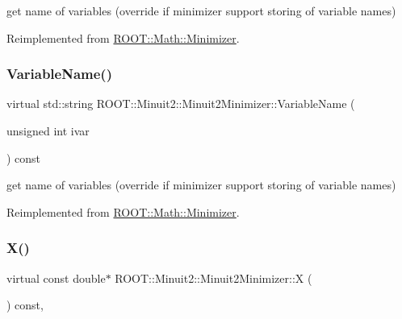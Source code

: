 get name of variables (override if minimizer support storing of variable names) 



Reimplemented from \mbox{\hyperlink{classROOT_1_1Math_1_1Minimizer_a4d6a3c9c95608b35a25f16afd50690ad}{R\+O\+O\+T\+::\+Math\+::\+Minimizer}}.

\mbox{\label{classROOT_1_1Minuit2_1_1Minuit2Minimizer_a8f5a6dc65fdfeb0351039d80f7c94968}} 
\subsubsection{\texorpdfstring{VariableName()}{VariableName()}\hspace{0.1cm}{\footnotesize\ttfamily [3/3]}}
{\footnotesize\ttfamily virtual std\+::string R\+O\+O\+T\+::\+Minuit2\+::\+Minuit2\+Minimizer\+::\+Variable\+Name (\begin{DoxyParamCaption}\item[{unsigned int}]{ivar }\end{DoxyParamCaption}) const\hspace{0.3cm}{\ttfamily [virtual]}}



get name of variables (override if minimizer support storing of variable names) 



Reimplemented from \mbox{\hyperlink{classROOT_1_1Math_1_1Minimizer_a4d6a3c9c95608b35a25f16afd50690ad}{R\+O\+O\+T\+::\+Math\+::\+Minimizer}}.

\mbox{\label{classROOT_1_1Minuit2_1_1Minuit2Minimizer_ac9372eb08937cf14acb8862ba3166c26}} 
\subsubsection{\texorpdfstring{X()}{X()}\hspace{0.1cm}{\footnotesize\ttfamily [1/3]}}
{\footnotesize\ttfamily virtual const double$\ast$ R\+O\+O\+T\+::\+Minuit2\+::\+Minuit2\+Minimizer\+::X (\begin{DoxyParamCaption}{ }\end{DoxyParamCaption}) const\hspace{0.3cm}{\ttfamily [inline]}, {\ttfamily [virtual]}}




